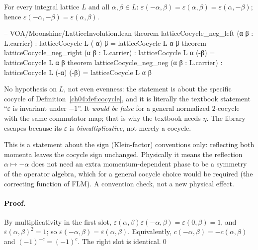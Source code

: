 \begin{proposition}\label{ch04:prop:cocneg}
For every integral lattice $L$ and all $\alpha,\beta\in L$:
$\varepsilon(-\alpha,\beta)=\varepsilon(\alpha,\beta)=\varepsilon(\alpha,-\beta)$; hence
$\varepsilon(-\alpha,-\beta)=\varepsilon(\alpha,\beta)$.
\end{proposition}

\begin{leancode}
-- VOA/Moonshine/LatticeInvolution.lean
theorem latticeCocycle_neg_left (α β : L.carrier) :
    latticeCocycle L (-α) β = latticeCocycle L α β
theorem latticeCocycle_neg_right (α β : L.carrier) :
    latticeCocycle L α (-β) = latticeCocycle L α β
theorem latticeCocycle_neg_neg (α β : L.carrier) :
    latticeCocycle L (-α) (-β) = latticeCocycle L α β
\end{leancode}

\begin{dictionary}
No hypothesis on $L$, not even evenness: the statement is about the specific cocycle
 of Definition~\ref{ch04:def:cocycle}, and it is literally the textbook
statement ``$\varepsilon$ is invariant under $-1$''. It \emph{would be false} for a general
normalized $2$-cocycle with the same commutator map; that is why the textbook needs $\eta$. The
library escapes because its $\varepsilon$ is \emph{bimultiplicative}, not merely a cocycle.
\end{dictionary}

\begin{physics}
This is a statement about the sign (Klein-factor) conventions only: reflecting both momenta leaves the cocycle sign unchanged. Physically it means the reflection $\alpha\mapsto-\alpha$ does not need an extra momentum-dependent phase to be a symmetry of the operator algebra, which for a general cocycle choice would be required (the correcting function of FLM). A convention check, not a new physical effect.
\end{physics}

\paragraph{Proof.} By multiplicativity in the first slot,
$\varepsilon(\alpha,\beta)\varepsilon(-\alpha,\beta)=\varepsilon(0,\beta)=1$, and
$\varepsilon(\alpha,\beta)^2=1$; so $\varepsilon(-\alpha,\beta)=\varepsilon(\alpha,\beta)$. Equivalently,
$c(-\alpha,\beta)=-c(\alpha,\beta)$ and $(-1)^{-c}=(-1)^c$. The right slot is identical.\qed

